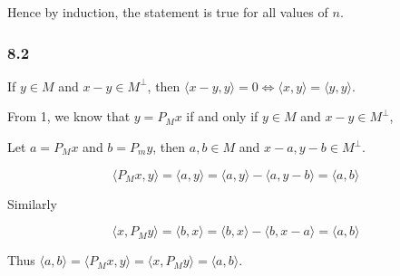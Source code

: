\documentclass[11pt]{article}
\begin{document}
Hence by induction, the statement is true for all values of \(n\).
\subsubsection{8.2}
\label{sec:org688d8e4}
If \(y \in M\) and \(x - y \in M^{\perp}\), then \(\langle x - y, y \rangle = 0
    \iff \langle x, y \rangle = \langle y, y \rangle\).

From 1, we know that \(y = P_Mx\) if and only if \(y \in M\) and \(x - y \in
    M^\perp\),

Let \(a = P_M x\) and \(b = P_m y\), then \(a, b \in M\) and \(x-a, y-b \in
    M^\perp\).

$$\langle P_M x, y \rangle = \langle a, y \rangle = \langle a, y \rangle - \langle a, y - b \rangle =
    \langle a, b\rangle$$

Similarly

$$\langle x, P_M y \rangle = \langle b, x \rangle = \langle b, x \rangle - \langle b, x - a \rangle =
    \langle a, b\rangle$$

Thus \(\langle a, b \rangle = \langle P_M x, y \rangle = \langle x, P_M y
    \rangle = \langle a, b\rangle\).
\end{document}
